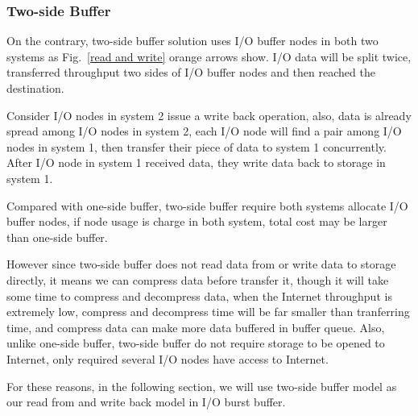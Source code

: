 
\subsubsection{Two-side Buffer}

On the contrary, two-side buffer solution uses I/O buffer nodes in both two systems as Fig.~\ref{read and write} orange arrows show.
I/O data will be split twice, transferred throughput two sides of I/O buffer nodes and then reached the destination.

Consider I/O nodes in system 2 issue a write back operation, also, data is already spread among I/O nodes in system 2, each I/O node will find a pair among I/O nodes in system 1, then transfer their piece of data to system 1 concurrently.
After I/O node in system 1 received data, they write data back to storage in system 1.

Compared with one-side buffer, %
two-side buffer require both systems allocate I/O buffer nodes, if node usage is charge in both system, total cost may be larger than one-side buffer.

However since two-side buffer does not read data from or write data to storage directly, it means we can compress data before transfer it, though it will take some time to compress and decompress data, when the Internet throughput is extremely low, compress and decompress time will be far smaller than tranferring time, and compress data can make more data buffered in buffer queue.
Also, unlike one-side buffer, two-side buffer do not require storage to be opened to Internet, only required several I/O nodes have access to Internet.

For these reasons, in the following section, we will use two-side buffer model as our read from and write back model in I/O burst buffer.

